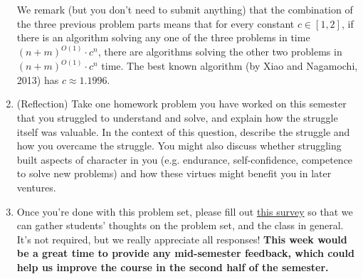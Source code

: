 \documentclass[11pt]{article}
\begin{document}
\begin{enumerate}
\begin{enumerate}
\end{enumerate}
 We remark (but you don't need to submit anything) that the combination of the three previous problem parts means that for every constant $c\in [1,2]$, if there is an algorithm solving any one of the three problems in time $(n+m)^{O(1)}\cdot c^n$, there are algorithms solving the other two problems in $(n+m)^{O(1)}\cdot c^n$ time.  The best known algorithm (by Xiao and Nagamochi, 2013) has $c \approx 1.1996$.
 



\item (Reflection) Take one homework problem you have worked on this semester that you struggled to understand and solve, and explain how the struggle itself was valuable.  In the context of this question, describe the struggle and how you overcame the struggle. You might also discuss whether struggling built aspects of character in you (e.g. endurance, self-confidence, competence to solve new problems) and how these virtues might benefit you in later ventures. 

\item Once you're done with this problem set, please fill out \href{https://forms.gle/D7d6EuQVCnTmz8ku6}{this survey} so that we can gather students' thoughts on the problem set, and the class in general. It's not required, but we really appreciate all responses! \textbf{This week would be a great time to provide any mid-semester feedback, which could help us improve the course in the second half of the semester.}


  \end{enumerate}
\end{document}
